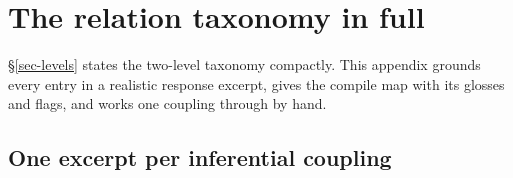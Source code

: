 \section{The relation taxonomy in full}
\label{app-taxonomy}

\S\ref{sec-levels} states the two-level taxonomy compactly. This appendix grounds every entry in a
realistic response excerpt, gives the compile map with its glosses and flags, and works one
coupling through by hand.

\subsection{One excerpt per inferential coupling}

